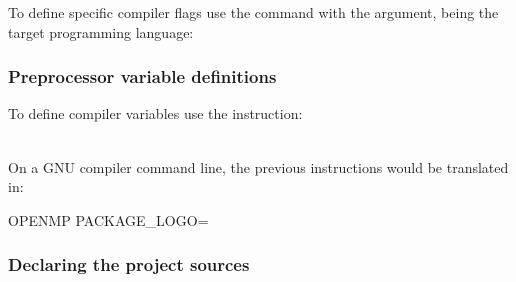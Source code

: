 To define specific compiler flags use the  command with the 
argument,  being the target programming language:
\begin{script}
\end{script}

\subsubsection*{Preprocessor variable definitions}

To define compiler variables use the  instruction:
\begin{script}
\end{script}
\\[-0.25cm]
\noindent On a GNU compiler command line, the previous instructions would be translated in:
\begin{script}
 OPENMP PACKAGE_LOGO=
\end{script}

\subsubsection*{Declaring the project sources}

